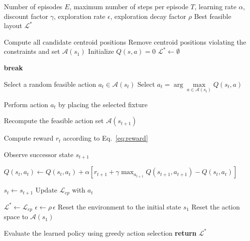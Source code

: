 \begin{algorithm}[t]
	\footnotesize
	\caption{Q-learning for Fixture Layout Optimization}
	\label{alg:qlearning_fixtures}
	\begin{algorithmic}[1]
		
		\Require Number of episodes $E$, maximum number of steps per episode $T$, learning rate $\alpha$, discount factor $\gamma$, exploration rate $\epsilon$, exploration decay factor $\rho$
		\Ensure Best feasible layout $\mathcal{L}^*$
		
		\State Compute all candidate centroid positions
		\label{alg:q_init_start}
		\State Remove centroid positions violating the constraints and set $\mathcal{A}(s_1)$
		\State Initialize $Q(s,a)=0$
		\State $\mathcal{L}^* \gets \emptyset$
		\label{alg:q_init_end}
		
		\label{alg:q_iteration_start}
		
		
		
		\State \textbf{break}
		\EndIf
		\label{alg:q_iteration_end}
		
		 
		\label{alg:q_policy_start}
		\State Select a random feasible action
		$a_t \in \mathcal{A}(s_t)$
		\Else {}
		\State Select
		$a_t=\arg\max\limits_{a\in\mathcal{A}(s_t)}Q(s_t,a)$
		\EndIf
		
		\State Perform action $a_t$ by placing the selected fixture
		\label{alg:q_policy_end}
		
		\State Recompute the feasible action set $\mathcal{A}(s_{t+1})$ 
		\label{alg:q_reset_action}
		
		\State Compute reward $r_t$ according to Eq.~\ref{eq:reward}
		\label{alg:q_update_start}
		
		\State Observe successor state $s_{t+1}$
		
		\State $Q(s_t,a_t) \gets Q(s_t,a_t) + \alpha \left[r_{t+1} + \gamma \max_{a_{t+1}}Q(s_{t+1},a_{t+1}) - Q(s_t,a_t) \right]$
		
		\State $s_t \gets s_{t+1}$
		\State Update $\mathcal{L}_{ep}$ with $a_t$
		\label{alg:q_update_end}
		
		\EndFor
		
		\label{alg:q_new_ep_start}
		\State $\mathcal{L}^* \gets \mathcal{L}_{ep}$
		\EndIf
		\State $\epsilon \gets \rho\,\epsilon$
		\State Reset the environment to the initial state $s_1$
		\State Reset the action space to $\mathcal{A}(s_1)$
		\label{alg:q_new_ep_end}
		
		\EndFor
		
		\State Evaluate the learned policy using greedy action selection
		\label{alg:q_evaluate_start}
		\State \textbf{return} $\mathcal{L}^*$
		\label{alg:q_evaluate_end}
		
	\end{algorithmic}
\end{algorithm}

